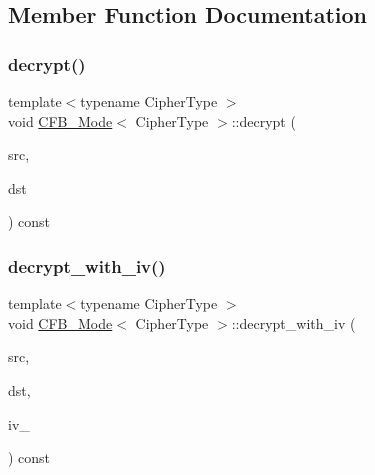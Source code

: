 \subsection{Member Function Documentation}
\mbox{\label{class_c_f_b___mode_a26084270b140d8f353d57dc1956a957b}} 
\subsubsection{\texorpdfstring{decrypt()}{decrypt()}}
{\footnotesize\ttfamily template$<$typename Cipher\+Type $>$ \\
void \hyperlink{class_c_f_b___mode}{C\+F\+B\+\_\+\+Mode}$<$ Cipher\+Type $>$\+::decrypt (\begin{DoxyParamCaption}\item[{const \hyperlink{class_byte_block}{Byte\+Block} \&}]{src,  }\item[{\hyperlink{class_byte_block}{Byte\+Block} \&}]{dst }\end{DoxyParamCaption}) const}

\mbox{\label{class_c_f_b___mode_a8dca3882db394b8b87947337bdb3c9c1}} 
\subsubsection{\texorpdfstring{decrypt\+\_\+with\+\_\+iv()}{decrypt\_with\_iv()}}
{\footnotesize\ttfamily template$<$typename Cipher\+Type $>$ \\
void \hyperlink{class_c_f_b___mode}{C\+F\+B\+\_\+\+Mode}$<$ Cipher\+Type $>$\+::decrypt\+\_\+with\+\_\+iv (\begin{DoxyParamCaption}\item[{const \hyperlink{class_byte_block}{Byte\+Block} \&}]{src,  }\item[{\hyperlink{class_byte_block}{Byte\+Block} \&}]{dst,  }\item[{const \hyperlink{class_byte_block}{Byte\+Block} \&}]{iv\+\_\+ }\end{DoxyParamCaption}) const\hspace{0.3cm}{\ttfamily [private]}}

